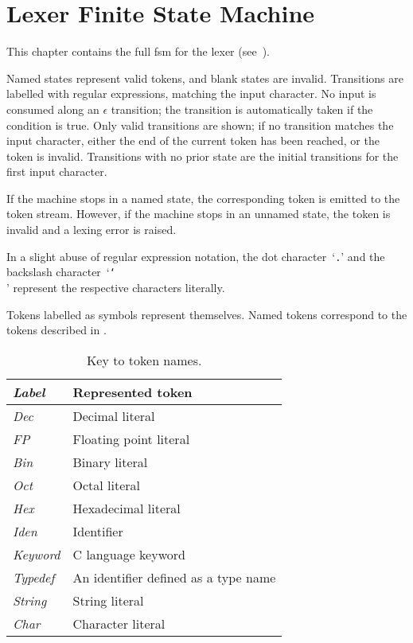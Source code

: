 \documentclass[../00-main.tex]{subfiles}
\begin{document}
\chapter{Lexer Finite State Machine}\label{app:lexer fsm}

This chapter contains the full \gls{fsm} for the lexer (see~).

Named states represent valid tokens, and blank states are invalid.
Transitions are labelled with regular expressions, matching the input character.
No input is consumed along an $\epsilon$ transition; the transition is automatically taken if the condition is true.
Only valid transitions are shown; if no transition matches the input character, either the end of the current token has been reached, or the token is invalid.
Transitions with no prior state are the initial transitions for the first input character.

If the machine stops in a named state, the corresponding token is emitted to the token stream.
However, if the machine stops in an unnamed state, the token is invalid and a lexing error is raised.

In a slight abuse of regular expression notation, the dot character~`\texttt{.}' and the backslash character~`\texttt{\char`\\}' represent the respective characters literally.

Tokens labelled as symbols represent themselves.
Named tokens correspond to the tokens described in .

\begin{table}[h]
  \centering
  \begin{tabular}{>{\itshape}ll} %
    \toprule
    \normalfont\textbf{Label} & \textbf{Represented token} \\
    \midrule
    Dec & Decimal literal \\
    FP & Floating point literal \\
    Bin & Binary literal \\
    Oct & Octal literal \\
    Hex & Hexadecimal literal \\
    Iden & Identifier \\
    Keyword & C language keyword \\
    Typedef & An identifier defined as a type name \\
    String & String literal \\
    Char & Character literal \\
    \bottomrule
  \end{tabular}
  \caption{Key to token names.}%
  \label{app:tab:token name key}
\end{table}
\end{document}
